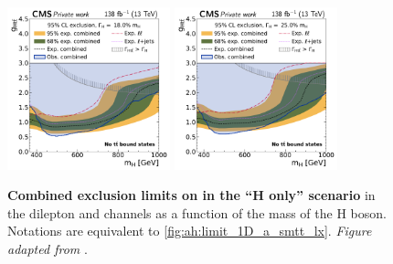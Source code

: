 \begin{figure}[!ph]
    \\
    \includegraphics[width=0.42\textwidth]{figures/ah/limits_combined/smtt/H_limit_w18p0_g-scan.pdf}%
    \hspace*{0.05\textwidth}%
    \includegraphics[width=0.42\textwidth]{figures/ah/limits_combined/smtt/H_limit_w25p0_g-scan.pdf}
    \caption{%
    \textbf{Combined exclusion limits on \gHtt in the ``H only'' scenario} in the dilepton and \ljets channels as a function of the mass of the H boson. Notations are equivalent to \cref{fig:ah:limit_1D_a_smtt_lx}. \textit{Figure adapted from }.
    }
    \label{fig:ah:limit_1D_h_smtt_lx}
\end{figure}

